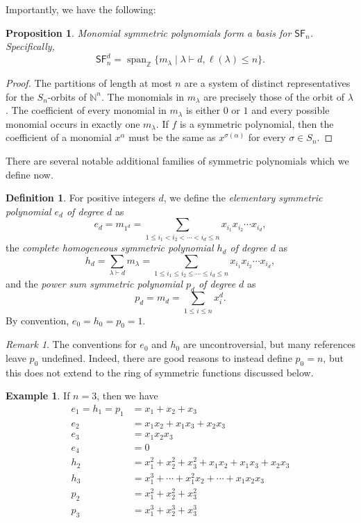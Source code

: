 \documentclass[12pt]{article}
\theoremstyle{plain}
\newtheorem{proposition}[theorem]{Proposition}
\theoremstyle{definition}
\newtheorem{definition}[theorem]{Definition}
\newtheorem{example}[theorem]{Example}
\theoremstyle{remark}
\newtheorem{remark}[theorem]{Remark}
\numberwithin{equation}{section}
\begin{document}
Importantly, we have the following:

\begin{proposition}
Monomial symmetric polynomials form a basis for $\mathsf{SF}_n$.
Specifically,
\[
\mathsf{SF}_n^d = \operatorname{span}_{\mathbb{Z}}
\{ m_\lambda \mid \lambda \vdash d, \ell(\lambda) \le n \}.
\]
\end{proposition}

\begin{proof}
The partitions of length at most $n$ are a system of distinct
representatives for the $S_n$-orbits of $\mathbb{N}^n$.
The monomials in $m_\lambda$ are precisely those of the orbit of
$\lambda$.
The coefficient of every monomial
in $m_\lambda$ is either $0$ or $1$ and every possible monomial
occurs in exactly one $m_\lambda$.
If $f$ is a symmetric polynomial, then the coefficient
of a monomial $x^\alpha$ must be the same as $x^{\sigma(\alpha)}$
for every $\sigma \in S_n$.  
\end{proof}

There are several notable additional families of symmetric polynomials
which we define now.

\begin{definition}
For positive integers $d$, we define
the \emph{elementary symmetric polynomial $e_d$ of degree $d$} as
\[
e_d = m_{1^d} = \sum_{1 \le i_1 < i_2 < \cdots < i_d \le n} x_{i_1}x_{i_2}\cdots
x_{i_d},
\]
the \emph{complete homogeneous symmetric polynomial $h_d$ of degree $d$} as
\[
h_d = \sum_{\lambda \vdash d} m_\lambda = \sum_{1 \le i_1 \le i_2 \le \cdots \le i_d \le n} x_{i_1}x_{i_2}\cdots
x_{i_d},
\]
and the \emph{power sum symmetric polynomial $p_d$ of degree $d$} as
\[
p_d = m_d = \sum_{1 \le i \le n} x_i^d.
\]
By convention, $e_0=h_0=p_0=1$.
\end{definition}

\begin{remark}
The conventions for $e_0$ and $h_0$ are uncontroversial,
but many references leave $p_0$ undefined.
Indeed, there are good reasons to instead define $p_0=n$, but this does not
extend to the ring of symmetric functions discussed below. 
\end{remark}

\begin{example}
If $n=3$, then we have
\begin{align*}
e_1 = h_1 = p_1 &= x_1 + x_2 + x_3\\
e_2 &= x_1x_2 + x_1x_3 + x_2x_3\\
e_3 &= x_1x_2x_3 \\
e_4 &= 0 \\
h_2 &= x_1^2 + x_2^2 + x_3^2 + x_1x_2 + x_1x_3 + x_2x_3\\
h_3 &= x_1^3 + \cdots + x_1^2x_2 + \cdots + x_1x_2x_3\\
p_2 &= x_1^2 + x_2^2 + x_3^2\\
p_3 &= x_1^3 + x_2^3 + x_3^3
\end{align*}
\end{example}
\end{document}

